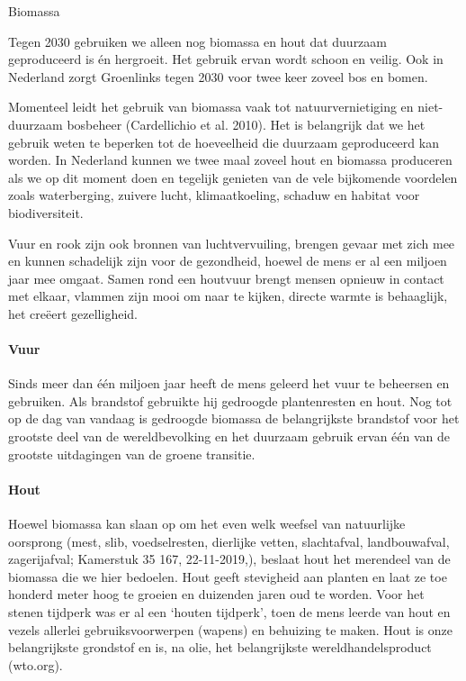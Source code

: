 \begin{voorstel}{Biomassa}

\begin{samenvatting}
Tegen 2030 gebruiken we alleen nog biomassa en hout dat duurzaam geproduceerd is én hergroeit.  Het gebruik ervan wordt schoon en veilig.  Ook in Nederland zorgt Groenlinks tegen 2030 voor twee keer zoveel bos en bomen.
\end{samenvatting}

\begin{multicols*}{2}

\begin{uitdaging}
Momenteel leidt het gebruik van biomassa vaak tot natuurvernietiging en niet-duurzaam bosbeheer (Cardellichio et al. 2010). Het is belangrijk dat we het gebruik weten te beperken tot de hoeveelheid die duurzaam geproduceerd kan worden. In Nederland kunnen we twee maal zoveel hout en biomassa produceren als we op dit moment doen en tegelijk genieten van de vele bijkomende voordelen zoals waterberging, zuivere lucht, klimaatkoeling, schaduw en habitat voor biodiversiteit.

Vuur en rook zijn ook bronnen van luchtvervuiling, brengen gevaar met zich mee en kunnen schadelijk zijn voor de gezondheid, hoewel de mens er al een miljoen jaar mee omgaat. Samen rond een houtvuur brengt mensen opnieuw in contact met elkaar, vlammen zijn mooi om naar te kijken, directe warmte is behaaglijk, het creëert gezelligheid.
\end{uitdaging}

\begin{overwegingen}
\paragraph{Vuur}
Sinds meer dan één miljoen jaar heeft de mens geleerd het vuur te beheersen en gebruiken. Als brandstof gebruikte hij gedroogde plantenresten en hout. Nog tot op de dag van vandaag is gedroogde biomassa de belangrijkste brandstof voor het grootste deel van de wereldbevolking en het duurzaam gebruik ervan één van de grootste uitdagingen van de groene transitie.

\paragraph{Hout}
Hoewel biomassa kan slaan op om het even welk weefsel van natuurlijke oorsprong (mest, slib, voedselresten, dierlijke vetten, slachtafval, landbouwafval, zagerijafval; Kamerstuk 35 167, 22-11-2019,), beslaat hout het merendeel van de biomassa die we hier bedoelen. Hout geeft stevigheid aan planten en laat ze toe honderd meter hoog te groeien en duizenden jaren oud te worden. Voor het stenen tijdperk was er al een ‘houten tijdperk’, toen de mens leerde van hout en vezels allerlei gebruiksvoorwerpen (wapens) en behuizing te maken. Hout is onze belangrijkste grondstof en is, na olie, het belangrijkste wereldhandelsproduct (wto.org).


\end{overwegingen}
\end{multicols*}
\end{voorstel}
